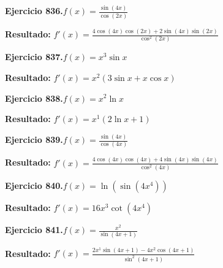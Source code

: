 \documentclass[10pt,a4paper]{article}
\begin{document}
\begin{ejbox}
\textbf{Ejercicio 836.}\quad $f(x) = \frac{\sin(4x)}{\cos(2x)}$
\end{ejbox}

\begin{solbox}
\textbf{Resultado:} \(\displaystyle f'(x) = \frac{4\cos(4x)\cos(2x) + 2\sin(4x)\sin(2x)}{\cos^2(2x)}\)
\end{solbox}

\begin{ejbox}
\textbf{Ejercicio 837.}\quad $f(x) = x^{3} \sin x$
\end{ejbox}

\begin{solbox}
\textbf{Resultado:} \(\displaystyle f'(x) = x^{2}(3\sin x + x\cos x)\)
\end{solbox}

\newpage
\begin{ejbox}
\textbf{Ejercicio 838.}\quad $f(x) = x^{2} \ln x$
\end{ejbox}

\begin{solbox}
\textbf{Resultado:} \(\displaystyle f'(x) = x^{1}(2\ln x + 1)\)
\end{solbox}

\begin{ejbox}
\textbf{Ejercicio 839.}\quad $f(x) = \frac{\sin(4x)}{\cos(4x)}$
\end{ejbox}

\begin{solbox}
\textbf{Resultado:} \(\displaystyle f'(x) = \frac{4\cos(4x)\cos(4x) + 4\sin(4x)\sin(4x)}{\cos^2(4x)}\)
\end{solbox}

\begin{ejbox}
\textbf{Ejercicio 840.}\quad $f(x) = \ln(\sin(4x^{4}))$
\end{ejbox}

\begin{solbox}
\textbf{Resultado:} \(\displaystyle f'(x) = 16x^{3}\cot(4x^{4})\)
\end{solbox}

\newpage
\begin{ejbox}
\textbf{Ejercicio 841.}\quad $f(x) = \frac{x^{2}}{\sin(4x +1)}$
\end{ejbox}

\begin{solbox}
\textbf{Resultado:} \(\displaystyle f'(x) = \frac{2x^{1}\sin(4x +1) - 4x^{2}\cos(4x +1)}{\sin^2(4x +1)}\)
\end{solbox}
\end{document}
